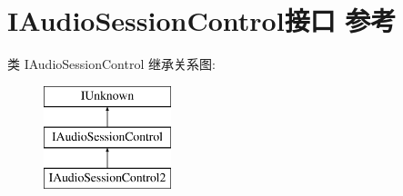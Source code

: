 \hypertarget{interface_i_audio_session_control}{}\section{I\+Audio\+Session\+Control接口 参考}
\label{interface_i_audio_session_control}
类 I\+Audio\+Session\+Control 继承关系图\+:\begin{figure}[H]
\begin{center}
\leavevmode
\includegraphics[height=3.000000cm]{interface_i_audio_session_control}
\end{center}
\end{figure}
